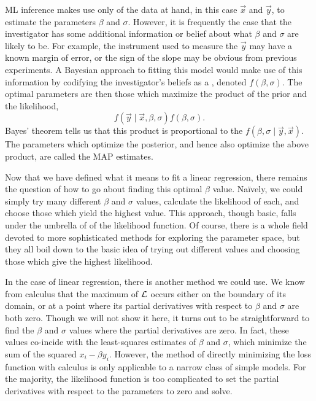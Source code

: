 \Gls{ML} inference makes use only of the data at hand, in this case
$\vec{x}$ and $\vec{y}$, to estimate the parameters $\beta$ and $\sigma$.
However, it is frequently the case that the investigator has some additional
 information or belief about what $\beta$ and $\sigma$ are likely
to be. For example, the instrument used to measure the $\vec{y}$ may have a
known margin of error, or the sign of the slope may be obvious from previous
experiments. A Bayesian approach to fitting this model would make use of this
information by codifying the investigator's beliefs as a , denoted $f(\beta, \sigma)$. The optimal parameters are then
those which maximize the product of the prior and the likelihood,
\[
  f(\vec{y} \mid \vec{x}, \beta, \sigma) f(\beta, \sigma).
\]
Bayes' theorem tells us that this product is proportional to the
 $f(\beta, \sigma \mid \vec{y}, \vec{x})$. The
parameters which optimize the posterior, and hence also optimize the above
product, are called the \gls{MAP} estimates.

Now that we have defined what it means to fit a linear regression, there
remains the question of how to go about finding this optimal $\beta$ value.
Na\"{i}vely, we could simply try many different $\beta$ and $\sigma$ values,
calculate the likelihood of each, and choose those which yield the highest
value. This approach, though basic, falls under the umbrella of  of the likelihood function. Of course, there is a whole field
devoted to more sophisticated methods for exploring the parameter space, but
they all boil down to the basic idea of trying out different values and
choosing those which give the highest likelihood.

In the case of linear regression, there is another method we could use. We know
from calculus that the maximum of $\mathcal{L}$ occurs either on the boundary of its
domain, or at a point where its partial derivatives with respect to $\beta$ and
$\sigma$ are both zero. Though we will not show it here, it turns out to be
straightforward to find the $\beta$ and $\sigma$ values where the partial
derivatives are zero. In fact, these values co-incide with the least-squares
estimates of $\beta$ and $\sigma$, which minimize the sum of the squared $x_i -
\beta y_i$. However, the method of directly minimizing the loss function with
calculus is only applicable to a narrow class of simple models. For the
majority, the likelihood function is too complicated to set the partial
derivatives with respect to the parameters to zero and solve.

